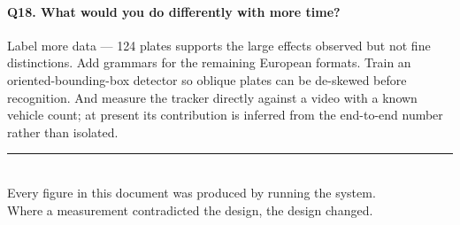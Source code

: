 \documentclass[11pt,a4paper]{article}
\begin{document}
\paragraph{Q18. What would you do differently with more time?}
Label more data --- 124 plates supports the large effects observed but not fine
distinctions. Add grammars for the remaining European formats. Train an
oriented-bounding-box detector so oblique plates can be de-skewed before
recognition. And measure the tracker directly against a video with a known
vehicle count; at present its contribution is inferred from the end-to-end
number rather than isolated.

\vfill
\begin{center}
\small\color{accent}
\rule{0.35\linewidth}{0.4pt}\\[0.4em]
Every figure in this document was produced by running the system.\\
Where a measurement contradicted the design, the design changed.
\end{center}
\end{document}
